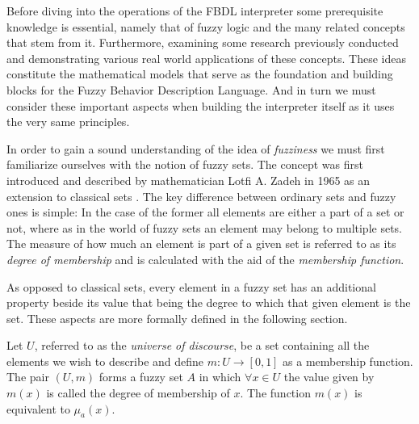 Before diving into the operations of the FBDL interpreter some prerequisite knowledge is essential, namely that of fuzzy logic and the many related concepts that stem from it. Furthermore, examining some research previously conducted and demonstrating various real world applications of these concepts. These ideas constitute the mathematical models that serve as the foundation and building blocks for the Fuzzy Behavior Description Language. And in turn we must consider these important aspects when building the interpreter itself as it uses the very same principles.

In order to gain a sound understanding of the idea of \textit{fuzziness} we must first familiarize ourselves with the notion of fuzzy sets. The concept was first introduced and described by mathematician Lotfi A. Zadeh in 1965 as an extension to classical sets \cite{zadeh1965}. The key difference between ordinary sets and fuzzy ones is simple: In the case of the former all elements are either a part of a set or not, where as in the world of fuzzy sets an element may belong to multiple sets. The measure of how much an element is part of a given set is referred to as its \textit{degree of membership} and is calculated with the aid of the \textit{membership function}.

As opposed to classical sets, every element in a fuzzy set has an additional property beside its value that being the degree to which that given element is the set. These aspects are more formally defined in the following section.

\begin{definition}
Let $U$, referred to as the \textit{universe of discourse}, be a set containing all the elements we wish to describe and define $m:U \to [0, 1]$ as a membership function. The pair $(U, m) $ forms a fuzzy set $A$ in which $\forall x \in U$ the value given by $m(x)$ is called the degree of membership of $x$. The function $m(x)$ is equivalent to $\mu_{a}(x)$.
\end{definition}

